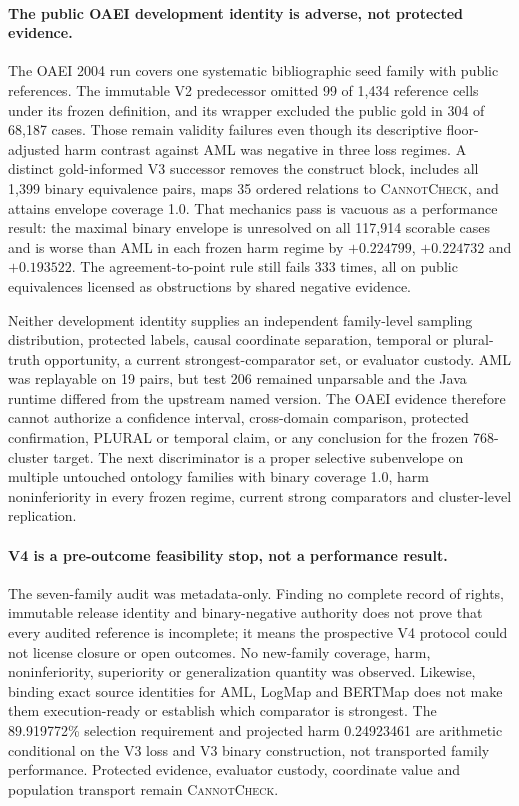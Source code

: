 \paragraph{The public OAEI development identity is adverse, not protected evidence.}
The OAEI 2004 run covers one systematic bibliographic seed family with public
references. The immutable V2 predecessor omitted 99 of 1,434 reference cells
under its frozen definition, and its wrapper excluded the public gold in 304 of
68,187 cases. Those remain validity failures even though its descriptive
floor-adjusted harm contrast against AML was negative in three loss regimes.
A distinct gold-informed V3 successor removes the construct block, includes
all 1,399 binary equivalence pairs, maps 35 ordered relations to
\textsc{CannotCheck}, and attains envelope coverage 1.0. That mechanics pass is
vacuous as a performance result: the maximal binary envelope is unresolved on
all 117,914 scorable cases and is worse than AML in each frozen harm regime by
$+0.224799$, $+0.224732$ and $+0.193522$. The agreement-to-point rule still
fails 333 times, all on public equivalences licensed as obstructions by shared
negative evidence.

Neither development identity supplies an independent family-level sampling
distribution, protected labels, causal coordinate separation, temporal or
plural-truth opportunity, a current strongest-comparator set, or evaluator
custody. AML was replayable on 19 pairs, but test 206 remained unparsable and
the Java runtime differed from the upstream named version. The OAEI evidence
therefore cannot authorize a confidence interval, cross-domain comparison,
protected confirmation, PLURAL or temporal claim, or any conclusion for the
frozen 768-cluster target. The next discriminator is a proper selective
subenvelope on multiple untouched ontology families with binary coverage 1.0,
harm noninferiority in every frozen regime, current strong comparators and
cluster-level replication.

\paragraph{V4 is a pre-outcome feasibility stop, not a performance result.}
The seven-family audit was metadata-only. Finding no complete record of rights,
immutable release identity and binary-negative authority does not prove that
every audited reference is incomplete; it means the prospective V4 protocol
could not license closure or open outcomes. No new-family coverage, harm,
noninferiority, superiority or generalization quantity was observed. Likewise,
binding exact source identities for AML, LogMap and BERTMap does not make them
execution-ready or establish which comparator is strongest. The 89.919772\%
selection requirement and projected harm 0.24923461 are arithmetic conditional
on the V3 loss and V3 binary construction, not transported family performance.
Protected evidence, evaluator custody, coordinate value and population
transport remain \textsc{CannotCheck}.

